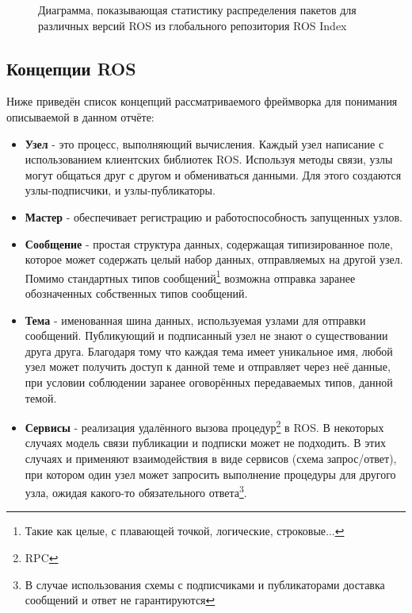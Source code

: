 \documentclass[12pt,a4paper]{scrartcl}
\begin{document}
				\begin{figure}[h]
					\caption{Диаграмма, показывающая статистику распределения пакетов для различных версий ROS из глобального репозитория ROS Index}
					\label{fig:ROSLogo}
				\end{figure}
			
			\subsection{Концепции ROS}
				Ниже приведён список концепций рассматриваемого фреймворка для понимания описываемой в данном отчёте: 
				\begin{itemize}
					\item {\textbf{Узел} - это процесс, выполняющий вычисления. Каждый узел написание с использованием клиентских библиотек ROS. Используя методы связи, узлы могут общаться друг с другом и обмениваться данными. Для этого создаются узлы-подписчики, и узлы-публикаторы.}
					\item {\textbf{Мастер} - обеспечивает регистрацию и работоспособность запущенных узлов.}
					\item {\textbf{Сообщение} - простая структура данных, содержащая типизированное поле, которое может содержать целый набор данных, отправляемых на другой узел. Помимо стандартных типов сообщений\footnote{Такие как целые, с плавающей точкой, логические, строковые...} возможна отправка заранее обозначенных собственных типов сообщений.}
					\item {\textbf{Тема} - именованная шина данных, используемая узлами для отправки сообщений. Публикующий и подписанный узел не знают о существовании друга друга. Благодаря тому что каждая тема имеет уникальное имя, любой узел может получить доступ к данной теме и отправляет через неё данные, при условии соблюдении заранее оговорённых передаваемых типов, данной темой.}
					\item {\textbf{Сервисы} - реализация удалённого вызова процедур\footnote{RPC} в ROS. В некоторых случаях модель связи публикации и подписки может не подходить. В этих случаях и применяют взаимодействия в виде сервисов (схема запрос/ответ), при котором один узел может запросить выполнение процедуры для другого узла, ожидая какого-то обязательного ответа\footnote{В случае использования схемы с подписчиками и публикаторами доставка сообщений и ответ не гарантируются}\cite{bib:ROSDefinition}. }
				\end{itemize}
				
\end{document}
